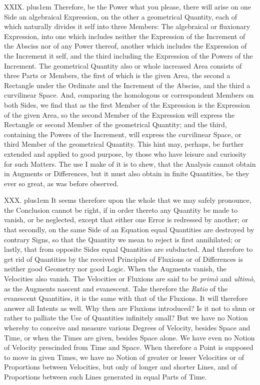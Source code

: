 
\medbreak

XXIX. \hskip 0pt plus1em
Therefore, be the Power what you please, there will arise on one
Side an algebraical Expression, on the other a geometrical
Quantity, each of which naturally divides it self into three
Members: The algebraical or fluxionary Expression, into one
which includes neither the Expression of the Increment of the
Absciss nor of any Power thereof, another which includes the
Expression of the Increment it self, and the third including the
Expression of the Powers of the Increment.  The geometrical
Quantity also or whole increased Area consists of three Parts or
Members, the first of which is the given Area, the second a
Rectangle under the Ordinate and the Increment of the Absciss,
and the third a curvilinear Space.  And, comparing the homologous
or correspondent Members on both Sides, we find that as the first
Member of the Expression is the Expression of the given Area, so
the second Member of the Expression will express the Rectangle or
second Member of the geometrical Quantity; and the third,
containing the Powers of the Increment, will express the
curvilinear Space, or third Member of the geometrical Quantity.
This hint may, perhaps, be further extended and applied to good
purpose, by those who have leisure and curiosity for such
Matters.  The use I make of it is to shew, that the Analysis
cannot obtain in Augments or Differences, but it must also obtain
in finite Quantities, be they ever so great, as was before
observed.

\medbreak

XXX. \hskip 0pt plus1em
It seems therefore upon the whole that we may safely pronounce,
the Conclusion cannot be right, if in order thereto any Quantity
be made to vanish, or be neglected, except that either one Error
is redressed by another; or that secondly, on the same Side of an
Equation equal Quantities are destroyed by contrary Signs, so
that the Quantity we mean to reject is first annihilated; or
lastly, that from opposite Sides equal Quantities are subducted.
And therefore to get rid of Quantities by the received Principles
of Fluxions or of Differences is neither good Geometry nor good
Logic.  When the Augments vanish, the Velocities also vanish.
The Velocities or Fluxions are said to be {\it prim\`{o}\/} and
{\it ultim\`{o}\/}, as the Augments nascent and evanescent.  Take
therefore the {\it Ratio\/} of the evanescent Quantities, it is
the same with that of the Fluxions.  It will therefore answer all
Intents as well.  Why then are Fluxions introduced?  Is it not to
shun or rather to palliate the Use of Quantities infinitely
small?  But we have no Notion whereby to conceive and measure
various Degrees of Velocity, besides Space and Time, or when the
Times are given, besides Space alone.  We have even no Notion of
Velocity prescinded from Time and Space.  When therefore a Point
is supposed to move in given Times, we have no Notion of greater
or lesser Velocities or of Proportions between Velocities, but
only of longer and shorter Lines, and of Proportions between such
Lines generated in equal Parts of Time.

